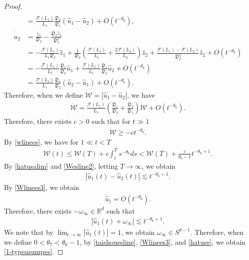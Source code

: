 \documentclass[10pt,a4paper]{amsart}
\numberwithin{equation}{section}
\begin{document}
\begin{proof}
\begin{align*}
\\
&=\frac{\mathcal{F}(L_1)}{L_1}\frac{\mathfrak{D}_2}{\mathfrak{D}_1}\left(\hat{u}_1-\hat{u}_2\right)+O\left(t^{-\theta_6}\right),
\\
\dot{\hat{u}}_2&=\frac{\dot{\hat{z}}_2}{\mathfrak{D}_2}-\frac{\dot{\mathfrak{D}}_2\hat{z}_2}{\mathfrak{D}_2^2}
\\
&=-\frac{\mathcal{F}(L_1)}{L_1\mathfrak{D}_2}\hat{z}_1+\frac{1}{\mathfrak{D}_2}\left(\frac{\mathcal{F}(L_1)}{L_1}+\frac{2\mathcal{F}(L_2)}{L_2}\right)\hat{z}_2+\frac{\mathcal{F}(L_1)-\mathcal{F}(L_2)}{\mathfrak{D}_2^2}\hat{z}_2+O\left(t^{-\theta_6}\right)
\\
&=-\frac{\mathcal{F}(L_1)}{L_1}\frac{\mathfrak{D}_1}{\mathfrak{D}_2}\hat{u}_1+\frac{\mathcal{F}(L_1)}{L_1}\frac{\mathfrak{D}_1}{\mathfrak{D}_2}\hat{u}_2+O\left(t^{-\theta_6}\right)
\\
&=\frac{\mathcal{F}(L_1)}{L_1}\frac{\mathfrak{D}_1}{\mathfrak{D}_2}\left(\hat{u}_2-\hat{u}_1\right)+O\left(t^{-\theta_6}\right).
\end{align*}
Therefore, when we define $\mathcal{W}=\left|\hat{u}_1-\hat{u}_2\right|$, we have
\begin{align*}
\dot{\mathcal{W}}=\frac{\mathcal{F}(L_1)}{L_1}\left(\frac{\mathfrak{D}_1}{\mathfrak{D}_2}+\frac{\mathfrak{D}_2}{\mathfrak{D}_1}\right)\mathcal{W}+O\left(t^{-\theta_6}\right).
\end{align*}
Therefore, there exists $c>0$ such that for $t\gg 1$
\begin{align}\label{wlinees}
\dot{\mathcal{W}}\geq -ct^{-\theta_6}.
\end{align}
By \eqref{wlinees}, we have for $1\ll t<T$
\begin{align}\label{Wesline2}
\mathcal{W}(t)\leq \mathcal{W}(T)+c\int_t^Ts^{-\theta_6}ds<\mathcal{W}(T)+\frac{c}{\theta_6-1}t^{-\theta_6+1}.
\end{align}
By \eqref{hatusalim} and \eqref{Wesline2}, letting $T\to\infty$, we obtain
\begin{align}\label{Wlinees3}
\left|\hat{u}_1(t)-\hat{u}_2(t)\right|\lesssim t^{-\theta_6+1}.
\end{align}
By \eqref{Wlinees3}, we obtain
\begin{align*}
\dot{\hat{u}}_1=O\left(t^{-\theta_6}\right).
\end{align*}
Therefore, there exists $-\omega_{\infty}\in\mathbb{R}^d$ such that 
\begin{align}\label{hatues}
\left|\hat{u}_1(t)+\omega_{\infty}\right|\lesssim t^{-\theta_6+1}.
\end{align}
We note that by $\lim_{t\to\infty}|\hat{u}_1(t)|=1$, we obtain $\omega_{\infty}\in S^{d-1}$. Therefore, when we define $0<\theta_7<\theta_6-1$, by \eqref{taishouesline}, \eqref{Wlinees3}, and \eqref{hatues}, we obtain \eqref{1-typeasumpes}.
\end{proof}
\end{document}
